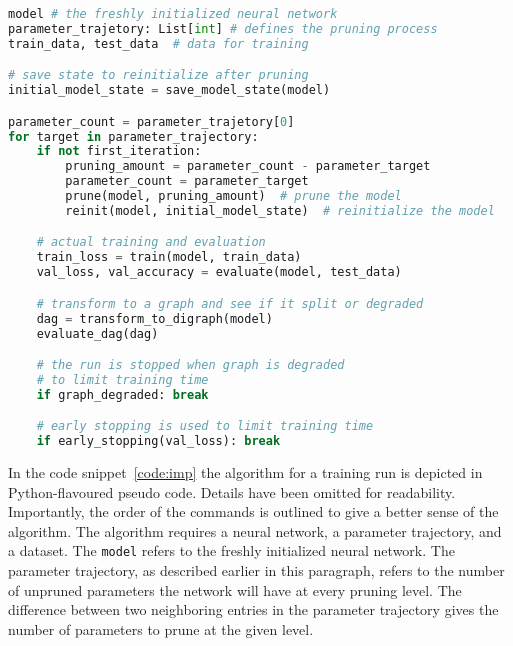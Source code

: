 \begin{minipage}{\linewidth} %
\begin{lstlisting}[language=Python,caption={
    Iterative magnitude pruning with parameter resetting; Python pseudo code
},captionpos=b, label={code:imp}]
model # the freshly initialized neural network 
parameter_trajetory: List[int] # defines the pruning process
train_data, test_data  # data for training

# save state to reinitialize after pruning
initial_model_state = save_model_state(model)

parameter_count = parameter_trajetory[0]
for target in parameter_trajectory:
    if not first_iteration:
        pruning_amount = parameter_count - parameter_target
        parameter_count = parameter_target
        prune(model, pruning_amount)  # prune the model 
        reinit(model, initial_model_state)  # reinitialize the model

    # actual training and evaluation
    train_loss = train(model, train_data)
    val_loss, val_accuracy = evaluate(model, test_data)

    # transform to a graph and see if it split or degraded
    dag = transform_to_digraph(model)
    evaluate_dag(dag)

    # the run is stopped when graph is degraded 
    # to limit training time
    if graph_degraded: break

    # early stopping is used to limit training time
    if early_stopping(val_loss): break
\end{lstlisting}
\end{minipage}

In the code snippet~\ref{code:imp} the algorithm for a training run is depicted in Python-flavoured pseudo code.
Details have been omitted for readability.
Importantly, the order of the commands is outlined to give a better sense of the algorithm.
The algorithm requires a neural network, a parameter trajectory, and a dataset.
The \lstinline{model} refers to the freshly initialized neural network.
The parameter trajectory, as described earlier in this paragraph, refers to the number of unpruned parameters the network will have at every pruning level.
The difference between two neighboring entries in the parameter trajectory gives the number of parameters to prune at the given level.
    

